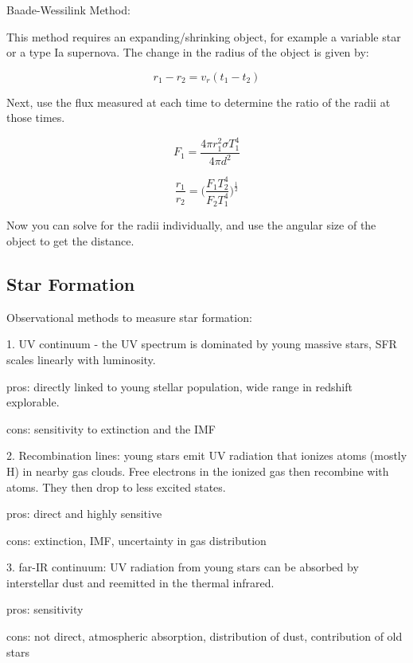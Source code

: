Baade-Wessilink Method:

This method requires an expanding/shrinking object, for example a variable star or a type Ia supernova.  The change in the radius of the object is given by:

\begin{equation}
r_1 - r_2 = v_r(t_1 - t_2)
\end{equation}

Next, use the flux measured at each time to determine the ratio of the radii at those times.

\begin{equation}
F_1 = \frac{4\pi r_1^2\sigma T_1^4}{4\pi d^2}
\end{equation}

\begin{equation}
\frac{r_1}{r_2} = \bigg(\frac{F_1T_2^4}{F_2T_1^4}\bigg)^{\frac{1}{2}}
\end{equation}

Now you can solve for the radii individually, and use the angular size of the object to get the distance.  


\subsection{Star Formation}

Observational methods to measure star formation:

1.  UV continuum - the UV spectrum is dominated by young massive stars, SFR scales linearly with luminosity.
	
	pros:  directly linked to young stellar population, wide range in redshift explorable.
	
	cons:  sensitivity to extinction and the IMF
	
2.  Recombination lines:  young stars emit UV radiation that ionizes atoms (mostly H) in nearby gas clouds.  Free electrons in the ionized gas then recombine with atoms.  They then drop to less excited states.  

	pros:  direct and highly sensitive
	
	cons:  extinction, IMF, uncertainty in gas distribution
	
3.  far-IR continuum:  UV radiation from young stars can be absorbed by interstellar dust and reemitted in the thermal infrared.

	pros:  sensitivity
	
	cons:  not direct, atmospheric absorption, distribution of dust, contribution of old stars


